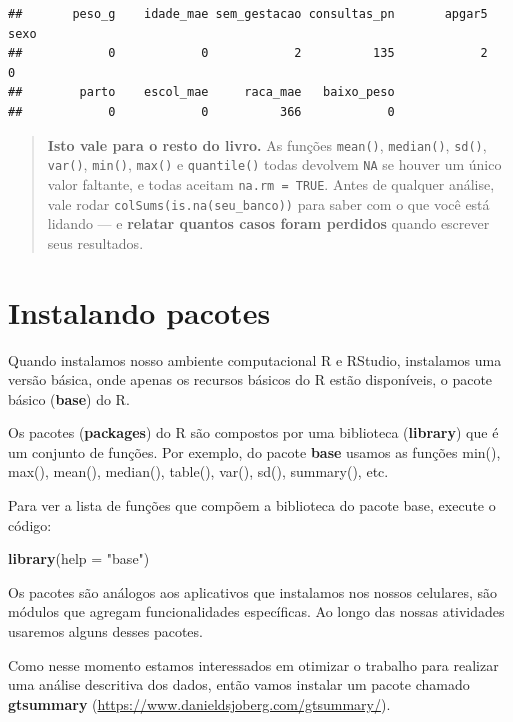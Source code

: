 \documentclass[
]{book}
\newenvironment{Shaded}{\begin{snugshade}}{\end{snugshade}}
\newcommand{\AttributeTok}[1]{\textcolor[rgb]{0.13,0.29,0.53}{#1}}
\newcommand{\FunctionTok}[1]{\textcolor[rgb]{0.13,0.29,0.53}{\textbf{#1}}}
\newcommand{\NormalTok}[1]{#1}
\newcommand{\StringTok}[1]{\textcolor[rgb]{0.31,0.60,0.02}{#1}}
\begin{document}
\begin{verbatim}
##       peso_g    idade_mae sem_gestacao consultas_pn       apgar5         sexo 
##            0            0            2          135            2            0 
##        parto    escol_mae     raca_mae   baixo_peso 
##            0            0          366            0
\end{verbatim}

\begin{quote}
\textbf{Isto vale para o resto do livro.} As funções \texttt{mean()}, \texttt{median()}, \texttt{sd()}, \texttt{var()}, \texttt{min()}, \texttt{max()} e \texttt{quantile()} todas devolvem \texttt{NA} se houver um único valor faltante, e todas aceitam \texttt{na.rm\ =\ TRUE}. Antes de qualquer análise, vale rodar \texttt{colSums(is.na(seu\_banco))} para saber com o que você está lidando --- e \textbf{relatar quantos casos foram perdidos} quando escrever seus resultados.
\end{quote}

\chapter{Instalando pacotes}\label{instalando-pacotes}

Quando instalamos nosso ambiente computacional R e RStudio, instalamos uma versão básica, onde apenas os recursos básicos do R estão disponíveis, o pacote básico (\textbf{base}) do R.

Os pacotes (\textbf{packages}) do R são compostos por uma biblioteca (\textbf{library}) que é um conjunto de funções. Por exemplo, do pacote \textbf{base} usamos as funções min(), max(), mean(), median(), table(), var(), sd(), summary(), etc.

Para ver a lista de funções que compõem a biblioteca do pacote base, execute o código:

\begin{Shaded}
\begin{Highlighting}[]
\FunctionTok{library}\NormalTok{(}\AttributeTok{help =} \StringTok{"base"}\NormalTok{)}
\end{Highlighting}
\end{Shaded}

Os pacotes são análogos aos aplicativos que instalamos nos nossos celulares, são módulos que agregam funcionalidades específicas. Ao longo das nossas atividades usaremos alguns desses pacotes.

Como nesse momento estamos interessados em otimizar o trabalho para realizar uma análise descritiva dos dados, então vamos instalar um pacote chamado \textbf{gtsummary} (\url{https://www.danieldsjoberg.com/gtsummary/}).
\end{document}
